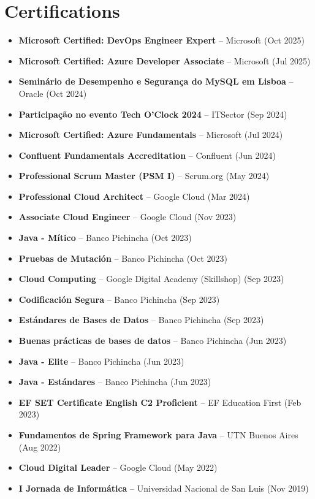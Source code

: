 \documentclass[10pt, letterpaper]{article}
\begin{document}
\section{Certifications}
\begin{itemize}[leftmargin=10pt, noitemsep]
    \item \textbf{Microsoft Certified: DevOps Engineer Expert} – Microsoft (Oct 2025)
    \item \textbf{Microsoft Certified: Azure Developer Associate} – Microsoft (Jul 2025)
    \item \textbf{Seminário de Desempenho e Segurança do MySQL em Lisboa} – Oracle (Oct 2024)
    \item \textbf{Participação no evento Tech O'Clock 2024} – ITSector (Sep 2024)
    \item \textbf{Microsoft Certified: Azure Fundamentals} – Microsoft (Jul 2024)
    \item \textbf{Confluent Fundamentals Accreditation} – Confluent (Jun 2024)
    \item \textbf{Professional Scrum Master (PSM I)} – Scrum.org (May 2024)
    \item \textbf{Professional Cloud Architect} – Google Cloud (Mar 2024)
    \item \textbf{Associate Cloud Engineer} – Google Cloud (Nov 2023)
    \item \textbf{Java - Mítico} – Banco Pichincha (Oct 2023)
    \item \textbf{Pruebas de Mutación} – Banco Pichincha (Oct 2023)
    \item \textbf{Cloud Computing} – Google Digital Academy (Skillshop) (Sep 2023)
    \item \textbf{Codificación Segura} – Banco Pichincha (Sep 2023)
    \item \textbf{Estándares de Bases de Datos} – Banco Pichincha (Sep 2023)
    \item \textbf{Buenas prácticas de bases de datos} – Banco Pichincha (Jun 2023)
    \item \textbf{Java - Elite} – Banco Pichincha (Jun 2023)
    \item \textbf{Java - Estándares} – Banco Pichincha (Jun 2023)
    \item \textbf{EF SET Certificate English C2 Proficient} – EF Education First (Feb 2023)
    \item \textbf{Fundamentos de Spring Framework para Java} – UTN Buenos Aires (Aug 2022)
    \item \textbf{Cloud Digital Leader} – Google Cloud (May 2022)
    \item \textbf{I Jornada de Informática} – Universidad Nacional de San Luis (Nov 2019)
\end{itemize}
\end{document}
